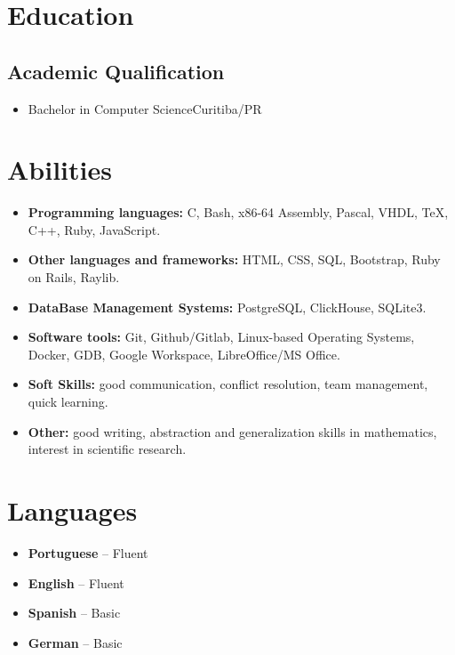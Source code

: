 \documentclass[a4paper, 12pt]{moderncv}
\begin{document}
\section{Education}
\vspace{1pt}
\subsection{\small{Academic Qualification}}
\vspace{2pt}
\begin{itemize}
    \item{
        {Bachelor in Computer Science}{Curitiba/PR}{}{}}
\end{itemize}
\vspace{4pt}

\section{Abilities}
\vspace{4pt}
\begin{itemize}
    \item{\textbf{Programming languages:} C, Bash, x86-64 Assembly, Pascal, VHDL,
        \TeX, C++, Ruby, JavaScript.}
    \item{\textbf{Other languages and frameworks:} HTML, CSS, SQL, Bootstrap,
        Ruby on Rails, Raylib.}
    \vspace{4pt}
    \item{\textbf{DataBase Management Systems:} PostgreSQL, ClickHouse, SQLite3.}
    \vspace{4pt}
    \item{\textbf{Software tools:} Git, Github/Gitlab, Linux-based Operating
        Systems, Docker, GDB, Google Workspace, LibreOffice/MS Office.}
    \vspace{4pt}
    \item{\textbf{Soft Skills:} good communication, conflict resolution, team management,
        quick learning.}
    \vspace{4pt}
    \item{\textbf{Other:} good writing, abstraction and generalization skills in
        mathematics, interest in scientific research.}
\end{itemize}
\vspace{4pt}

\section{Languages}
\vspace{4pt}
\begin{itemize}
    \item{\textbf{Portuguese} -- Fluent}
    \item{\textbf{English} -- Fluent}
    \item{\textbf{Spanish} -- Basic}
    \item{\textbf{German} -- Basic}
\end{itemize}
\vspace{4pt}
\end{document}
